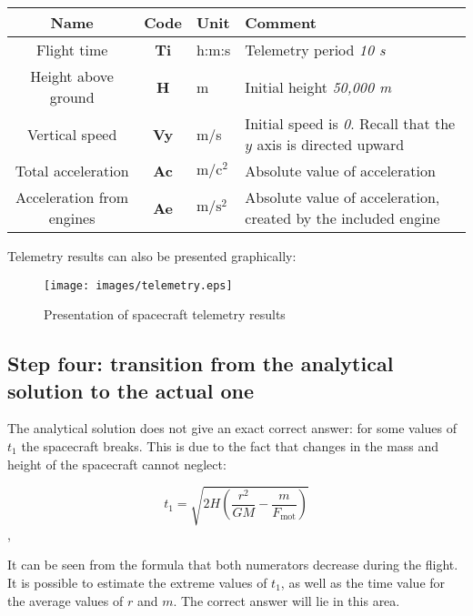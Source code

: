 \documentclass[12pt,a4paper]{article}
\begin{document}
\begin{center}
\begin{tabular}{ |c|c|p{2.5cm}|p{6cm}| }
   \hline
   \textbf{Name} & \textbf{Code} & \textbf{Unit} & \textbf{Comment} \\
   \hline
   Flight time & \textbf{Ti} & h:m:s & Telemetry period \emph{10 s}\\
   \hline
   Height above ground & \textbf{H} & m & Initial height \emph{50,000 m}\\
   \hline
   Vertical speed & \textbf{Vy} & m/s & Initial speed is
   \emph{0}. Recall that the $y$ axis is directed upward\\
   \hline
   Total acceleration & \textbf{Ac} & $\text{m}/\text{c}^{2}$ & Absolute value of acceleration\\
   \hline
   Acceleration from engines & \textbf{Ae} & $\text{m}/\text{s}^{2}$ & Absolute value of acceleration,
   created by the included engine\\
   \hline
\end{tabular}
\end{center}

Telemetry results can also be presented graphically:

\begin{figure}[tbh]
  \begin{center}
    \texttt{[image: images/telemetry.eps]}
    \caption{Presentation of spacecraft telemetry results}
    \label{Pic:telemetry}
  \end{center}
\end{figure}

\hfill

\noindent{}

\subsection{Step four: transition from the analytical solution to the actual one}

The analytical solution does not give an exact correct answer: for some values of $t_1$ the spacecraft breaks. This is due to the fact that changes in the mass and height of the spacecraft cannot
neglect:

$$ t_1 = \sqrt{2 H \left(\frac{r^2}{G M} - \frac{m}{F_{\text{mot}}}\right)} $$,

It can be seen from the formula that both numerators decrease during the flight. It is possible to estimate the extreme values of $t_1$, as well as the time value for the average values of $r$ and $m$. The correct answer will lie in this area.
\end{document}
